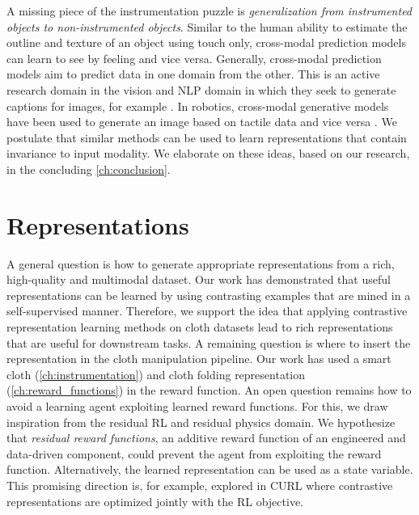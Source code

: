 \documentclass[\home/main.tex]{subfiles}
\begin{document}
A missing piece of the instrumentation puzzle is \emph{generalization from instrumented objects to non-instrumented objects}. Similar to the human ability to estimate the outline and texture of an object using touch only, cross-modal prediction models can learn to see by feeling and vice versa. Generally, cross-modal prediction models aim to predict data in one domain from the other. This is an active research domain in the vision and NLP domain in which they seek to generate captions for images, for example \autocite{donahue2015long}. In robotics, cross-modal generative models have been used to generate an image based on tactile data and vice versa \autocite{Li2019}. We postulate that similar methods can be used to learn representations that contain invariance to input modality. We elaborate on these ideas, based on our research, in the concluding \cref{ch:conclusion}. 

\section{Representations} \label{sec:towards_sensing_representation}

A general question is how to generate appropriate representations from a rich, high-quality and multimodal dataset.
Our work has demonstrated that useful representations can be learned by using contrasting examples that are mined in a self-supervised manner. Therefore, we support the idea that applying contrastive representation learning methods on cloth datasets lead to rich representations that are useful for downstream tasks. A remaining question is where to insert the representation in the cloth manipulation pipeline. 
Our work has used a smart cloth (\cref{ch:instrumentation}) and cloth folding representation (\cref{ch:reward_functions}) in the reward function. An open question remains how to avoid a learning agent exploiting learned reward functions. For this, we draw inspiration from the residual RL and residual physics domain. We hypothesize that \emph{residual reward functions}, an additive reward function of an engineered and data-driven component, could prevent the agent from exploiting the reward function. Alternatively, the learned representation can be used as a state variable. This promising direction is, for example, explored in CURL \autocite{Srinivas2020CURL} where contrastive representations are optimized jointly with the RL objective. 
\end{document}
